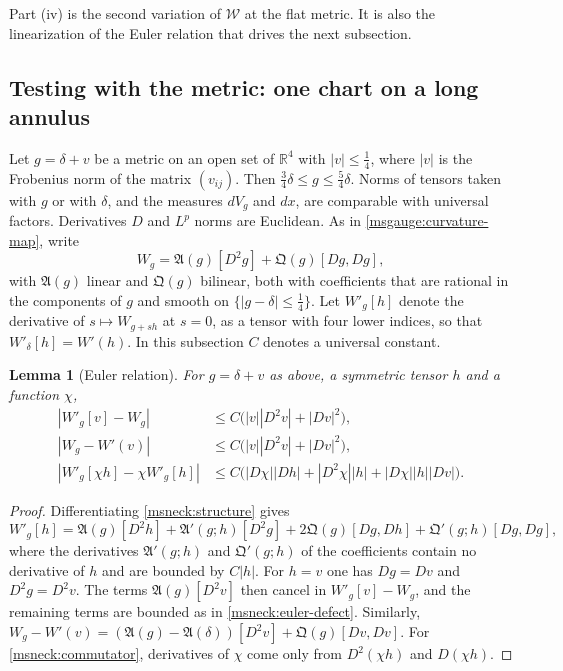 \documentclass[11pt]{article}
\numberwithin{equation}{section}
\newtheorem{lemma}[theorem]{Lemma}
\theoremstyle{definition}
\theoremstyle{remark}
\begin{document}
Part (iv) is the second variation of \(\mathcal W\) at the flat metric.
It is also the linearization of the Euler relation that drives the
next subsection.

\subsection{Testing with the metric: one chart on a long annulus}
\label{msneck:chart}

Let \(g=\delta+v\) be a metric on an open set of \(\mathbb R^4\) with
\(|v|\le\tfrac14\), where \(|v|\) is the Frobenius norm of the matrix
\((v_{ij})\). Then \(\tfrac34\delta\le g\le\tfrac54\delta\). Norms of
tensors taken with \(g\) or with \(\delta\), and the measures \(dV_g\) and
\(dx\), are comparable with universal factors. Derivatives \(D\) and
\(L^p\) norms are Euclidean. As in \eqref{msgauge:curvature-map}, write
\begin{equation}\label{msneck:structure}
 W_g=\mathfrak A(g)[D^2g]+\mathfrak Q(g)[Dg,Dg],
\end{equation}
with \(\mathfrak A(g)\) linear and \(\mathfrak Q(g)\) bilinear, both with
coefficients that are rational in the components of \(g\) and smooth
on \(\{|g-\delta|\le\tfrac14\}\). Let \(W'_g[h]\) denote the derivative of
\(s\mapsto W_{g+sh}\) at \(s=0\), as a tensor with four lower indices,
so that \(W'_\delta[h]=W'(h)\). In this subsection \(C\) denotes a
universal constant.

\begin{lemma}[Euler relation]\label{msneck:euler}
For \(g=\delta+v\) as above, a symmetric tensor \(h\) and a function
\(\chi\),
\begin{align}
 |W'_g[v]-W_g|&\le C\bigl(|v||D^2v|+|Dv|^2\bigr),\label{msneck:euler-defect}\\
 |W_g-W'(v)|&\le C\bigl(|v||D^2v|+|Dv|^2\bigr),\label{msneck:flat-defect}\\
 |W'_g[\chi h]-\chi W'_g[h]|&\le C\bigl(|D\chi||Dh|+|D^2\chi||h|
   +|D\chi||h||Dv|\bigr).\label{msneck:commutator}
\end{align}
\end{lemma}

\begin{proof}
Differentiating \eqref{msneck:structure} gives
\[
 W'_g[h]=\mathfrak A(g)[D^2h]+\mathfrak A'(g;h)[D^2g]
 +2\mathfrak Q(g)[Dg,Dh]+\mathfrak Q'(g;h)[Dg,Dg],
\]
where the derivatives \(\mathfrak A'(g;h)\) and \(\mathfrak Q'(g;h)\) of
the coefficients contain no derivative of \(h\) and are bounded by
\(C|h|\). For \(h=v\) one has \(Dg=Dv\) and \(D^2g=D^2v\). The terms
\(\mathfrak A(g)[D^2v]\) then cancel in \(W'_g[v]-W_g\), and the remaining
terms are bounded as in \eqref{msneck:euler-defect}. Similarly,
\(W_g-W'(v)=(\mathfrak A(g)-\mathfrak A(\delta))[D^2v]+\mathfrak Q(g)[Dv,Dv]\).
For \eqref{msneck:commutator}, derivatives of \(\chi\) come only from
\(D^2(\chi h)\) and \(D(\chi h)\).
\end{proof}
\end{document}
